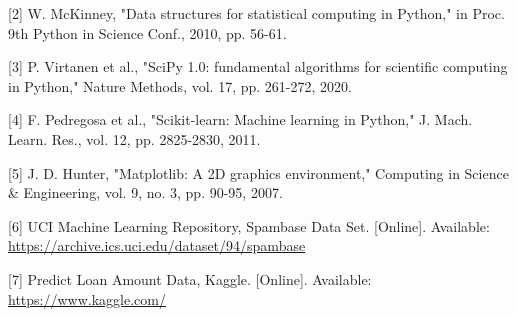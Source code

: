 \documentclass[11pt]{article}
\begin{document}
[2] W. McKinney, "Data structures for statistical computing in Python," in Proc. 9th Python in Science Conf., 2010, pp. 56-61.

[3] P. Virtanen et al., "SciPy 1.0: fundamental algorithms for scientific computing in Python," Nature Methods, vol. 17, pp. 261-272, 2020.

[4] F. Pedregosa et al., "Scikit-learn: Machine learning in Python," J. Mach. Learn. Res., vol. 12, pp. 2825-2830, 2011.

[5] J. D. Hunter, "Matplotlib: A 2D graphics environment," Computing in Science \& Engineering, vol. 9, no. 3, pp. 90-95, 2007.

[6] UCI Machine Learning Repository, Spambase Data Set. [Online]. Available: \url{https://archive.ics.uci.edu/dataset/94/spambase}

[7] Predict Loan Amount Data, Kaggle. [Online]. Available: \url{https://www.kaggle.com/}
\end{document}
